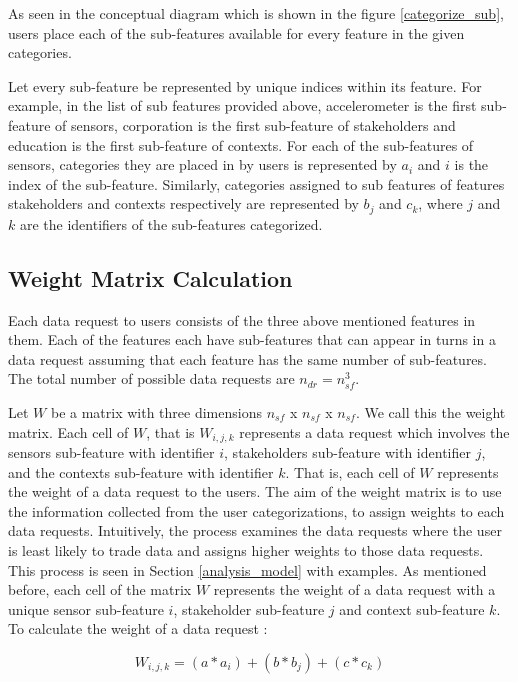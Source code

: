 As seen in the conceptual diagram which is shown in the figure \ref{categorize_sub}, users place each of the sub-features available for every feature in the given categories.

Let every sub-feature be represented by unique indices within its feature. For example, in the list of sub features provided above, accelerometer is the first sub-feature of sensors, corporation is the first sub-feature of stakeholders and education is the first sub-feature of contexts. For each of the sub-features of sensors, categories they are placed in by users is represented by $a_{i}$ and $i$ is the index
of the sub-feature. Similarly, categories assigned to sub features of features stakeholders and contexts respectively are represented by $b_{j}$ and $c_{k}$, where $j$ and $k$ are the identifiers of the sub-features categorized.

\subsection{Weight Matrix Calculation}
Each data request to users consists of the three above mentioned features in them. Each of the features each have \numsubfeatures sub-features that can appear in turns in a data request assuming that each feature has the same number of sub-features. The total number of possible data requests are $n_{dr} =  n_{sf}^3$.

Let $W$  be a matrix with three dimensions $n_{sf}$ x $n_{sf}$ x $n_{sf}$. We call this the weight matrix.
Each cell of $W$, that is $W_{i,j,k}$ represents a data request which involves the sensors sub-feature with identifier $i$, stakeholders sub-feature with identifier $j$,
and the contexts sub-feature with identifier $k$. That is, each cell of $W$ represents the weight of a data request to the users. The aim of the weight matrix is to use the information collected from the user categorizations, to assign weights to each data requests. Intuitively, the process examines the
data requests where the user is least likely to trade data and assigns higher weights to those data requests. This process is seen in
Section \ref{analysis_model} with examples. As mentioned before, each cell of the matrix $W$ represents the weight of a data request with a unique sensor sub-feature $i$, stakeholder sub-feature $j$ and context sub-feature $k$. To calculate the weight of a data request :

\begin{equation}
W_{i,j,k} = (a*a_{i}) + (b*b_{j}) + (c*c_{k})
\end{equation}

